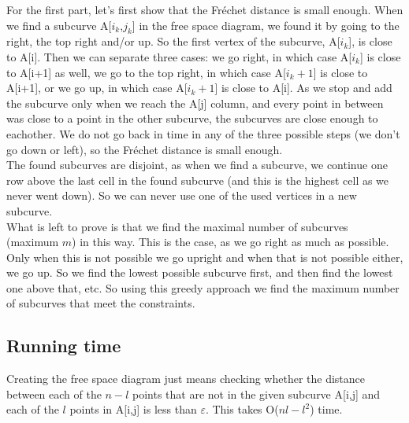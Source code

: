 \documentclass[a4paper,11pt]{article}
\begin{document}
For the first part, let's first show that the Fr\'{e}chet distance is small enough. When we find a subcurve A[$i_k$,$j_k$] in the free space diagram, we found it by going to the right, the top right and/or up. So the first vertex of the subcurve, A[$i_k$], is close to A[i]. Then we can separate three cases: we go right, in which case A[$i_k$] is close to A[i+1] as well, we go to the top right, in which case A[$i_k+1$] is close to A[i+1], or we go up, in which case A[$i_k+1$] is close to A[i]. As we stop and add the subcurve only when we reach the A[j] column, and every point in between was close to a point in the other subcurve, the subcurves are close enough to eachother. We do not go back in time in any of the three possible steps (we don't go down or left), so the Fr\'{e}chet distance is small enough.\\
The found subcurves are disjoint, as when we find a subcurve, we continue one row above the last cell in the found subcurve (and this is the highest cell as we never went down). So we can never use one of the used vertices in a new subcurve.\\

What is left to prove is that we find the maximal number of subcurves (maximum $m$) in this way. This is the case, as we go right as much as possible. Only when this is not possible we go upright and when that is not possible either, we go up. So we find the lowest possible subcurve first, and then find the lowest one above that, etc. So using this greedy approach we find the maximum number of subcurves that meet the constraints.

\subsection*{Running time}
Creating the free space diagram just means checking whether the distance between each of the $n-l$ points that are not in the given subcurve A[i,j] and each of the $l$ points in A[i,j] is less than $\varepsilon$. This takes O($nl-l^2$) time. %
\end{document}
